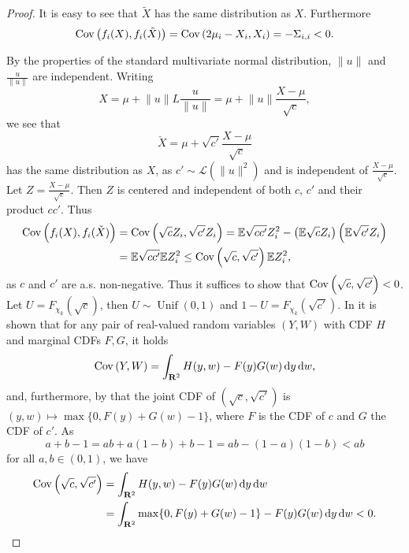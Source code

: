 \begin{proof}
    It is easy to see that $\tilde X$ has the same distribution as $X$. Furthermore 
    $$
        \operatorname{Cov} \left( f_{i}(X), f_{i}(\tilde X)\right) = \operatorname{Cov} \left( 2 \mu_{i} - X_{i}, X_{i} \right) = - \Sigma_{i,i} < 0.
    $$

    By the properties of the standard multivariate normal distribution, $ \lVert u \rVert $ and $ \frac{u}{ \lVert u \rVert }$ are independent. Writing 
    $$
        X = \mu + \lVert u \rVert L \frac{u}{ \lVert u \rVert } = \mu + \lVert u \rVert \frac{X - \mu}{\sqrt{c}},
    $$
    we see that 
    $$
        \check X = \mu + \sqrt{c'}\frac{X - \mu}{\sqrt{c}}
    $$
    has the same distribution as $X$, as $c' \sim \mathcal L( \lVert u \rVert^{2})$ and is independent of $ \frac{X - \mu}{\sqrt{c}}$. 
    Let $Z = \frac{X - \mu}{\sqrt{c}}$. Then $Z$ is centered and independent of both $c$, $c'$ and their product $cc'$. Thus 
    \begin{align*}
        \operatorname{Cov} \left(f_{i}(X), f_{i}(\check X) \right) &= \operatorname{Cov} \left( \sqrt{c} Z_{i}, \sqrt{c'}Z_{i} \right) = \mathbb E  \sqrt{cc'}Z_{i}^2 - \left( \mathbb E \sqrt c Z_{i} \right) \left( \mathbb E \sqrt {c'} Z_{i} \right) \\
        &= \mathbb E \sqrt{cc'} \mathbb E Z_{i}^2 \leq \operatorname{Cov} \left( \sqrt{c}, \sqrt{c'} \right) \mathbb E Z_{i}^2,
    \end{align*}
    as $c$ and $c'$ are a.s. non-negative. Thus it suffices to show that $\operatorname{Cov} \left( \sqrt{c}, \sqrt{c'} \right) < 0$. Let $U = F_{\chi_{k}}(\sqrt{c})$, then $U \sim \operatorname{Unif}(0,1)$ and $1 - U = F_{\chi_k}(\sqrt{c'})$. 
    In \citep[Lemma 2.3]{Whitt1976Bivariate} it is shown that for any pair of real-valued random variables $(Y,W)$ with CDF $H$ and marginal CDFs $F, G$, it holds
    $$
        \operatorname{Cov} \left(Y,W \right) = \int_{\mathbf R^{2}} H(y,w) - F(y)G(w) \,\mathrm d y \,\mathrm d w,
    $$
    and, furthermore, by \citep[Theorem 2.1 and Lemma 2.4]{Whitt1976Bivariate} that the joint CDF of $(\sqrt{c}, \sqrt{c'})$ is $(y,w) \mapsto \max \{0, F(y) + G(w) - 1\}$, where $F$ is the CDF of $c$ and $G$ the CDF of $c'$. 
    As 
    $$
        a + b - 1 = ab + a(1-b) + b - 1 = ab - (1 - a)(1 - b) < ab
    $$
    for all $a,b \in (0,1)$, we have 
    \begin{align*}
        \operatorname{Cov} \left( \sqrt{c}, \sqrt{c'} \right) &= \int_{\mathbf R^{2}} H(y,w) - F(y)G(w) \,\mathrm d y \,\mathrm d w \\
        &= \int_{\mathbf R^{2}} \max\{0, F(y) + G(w) - 1\} - F(y)G(w) \,\mathrm d y \,\mathrm d w < 0.
    \end{align*}
\end{proof}

